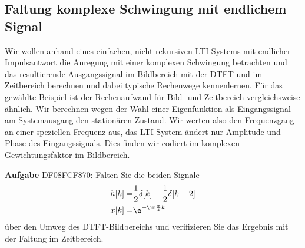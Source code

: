 \subsection{Faltung komplexe Schwingung mit endlichem Signal}
\label{sec:DF08FCF870}
\begin{Ziel}
Wir wollen anhand eines einfachen, nicht-rekursiven LTI Systems mit endlicher Impulsantwort
die Anregung mit einer komplexen Schwingung betrachten und das resultierende
Ausgangssignal im Bildbereich mit der DTFT und im Zeitbereich berechnen und
dabei typische Rechenwege kennenlernen. Für das gewählte
Beispiel ist der Rechenaufwand für Bild- und Zeitbereich
vergleichsweise ähnlich.
%
Wir berechnen wegen der Wahl einer Eigenfunktion als Eingangssignal
am Systemausgang den stationären Zustand. Wir werten also den Frequenzgang
an einer speziellen Frequenz aus, das LTI System ändert nur Amplitude und Phase
des Eingangssignals. Dies finden wir codiert im komplexen Gewichtungsfaktor
im Bildbereich.
\end{Ziel}
\textbf{Aufgabe} {\tiny DF08FCF870}: Falten Sie die beiden Signale
\begin{align}
h[k] =& \frac{1}{2}\delta[k] - \frac{1}{2}\delta[k-2]\\
x[k] =& \e^{+\im \frac{\pi}{4} k}
\end{align}
über den Umweg des DTFT-Bildbereichs und verifizieren Sie das Ergebnis
mit der Faltung im Zeitbereich.

